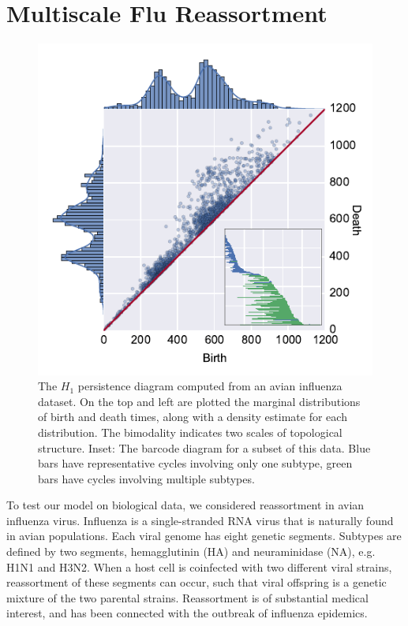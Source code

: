 \section{Multiscale Flu Reassortment}
\label{sec:flu_multiscale_reassortment}

\begin{figure}
\begin{center}
\centerline{\includegraphics[width=\columnwidth]{./fig/flu_scatterplot.pdf}}
\caption[$H_1$ persistence diagram computed from an avian influenza dataset.]{The $H_1$ persistence diagram computed from an avian influenza dataset. On the top and left are plotted the marginal distributions of birth and death times, along with a density estimate for each distribution. The bimodality indicates two scales of topological structure. Inset: The barcode diagram for a subset of this data. Blue bars have representative cycles involving only one subtype, green bars have cycles involving multiple subtypes.}
\label{fig:flu_scatterplot}
\end{center}
\end{figure}

To test our model on biological data, we considered reassortment in avian influenza virus.
Influenza is a single-stranded RNA virus that is naturally found in avian populations.
Each viral genome has eight genetic segments.
Subtypes are defined by two segments, hemagglutinin (HA) and neuraminidase (NA), e.g. H1N1 and H3N2.
When a host cell is coinfected with two different viral strains, reassortment of these segments can occur, such that viral offspring is a genetic mixture of the two parental strains.
Reassortment is of substantial medical interest, and has been connected with the outbreak of influenza epidemics.

